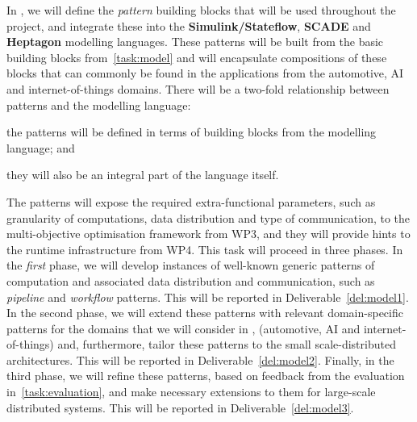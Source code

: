 \begin{Workpackage}{\thewpno}
\begin{Task}


\TaskResults{
\ref{del:model1}
\ref{del:model2}
\ref{del:model3}
}
\TaskHeader{}

In \theTask, we will define the \emph{pattern} building blocks that will be used throughout the \TheProject{} project,
and integrate these into the  \textbf{Simulink/Stateflow}, \textbf{SCADE} and \textbf{Heptagon} modelling
languages. These patterns will be built from the basic building blocks from~\ref{task:model} and will encapsulate compositions of these blocks that can commonly be found in the applications from the automotive, AI and internet-of-things domains. There will be a two-fold relationship between patterns and the modelling language:
\begin{inparaenum}
\item
the patterns will be defined in terms of building blocks from the modelling language; and
\item
they will also be an integral part of
the language itself. 
\end{inparaenum}
The patterns will expose the required extra-functional
parameters, such as granularity of computations, data distribution and type of communication, to the multi-objective
optimisation framework from WP3, and they will provide hints to the
runtime infrastructure from WP4. This task will proceed
in three phases. In the \emph{first} phase, we will develop instances of well-known generic
patterns of computation and associated data distribution and communication, such as \emph{pipeline} and \emph{workflow}
patterns. This will be reported in Deliverable~\ref{del:model1}. In the
second phase, we will extend these patterns with relevant domain-specific patterns for the domains that we will consider in \TheProject,
(automotive, AI and internet-of-things) and, furthermore, tailor these patterns to the small scale-distributed architectures.  This will be reported in Deliverable~\ref{del:model2}. Finally,
in the third phase, we will refine these patterns, based on feedback from the evaluation in~\ref{task:evaluation}, and make necessary extensions to them for large-scale distributed systems. This will be reported in Deliverable~\ref{del:model3}.
\end{Task}


\end{Workpackage}
